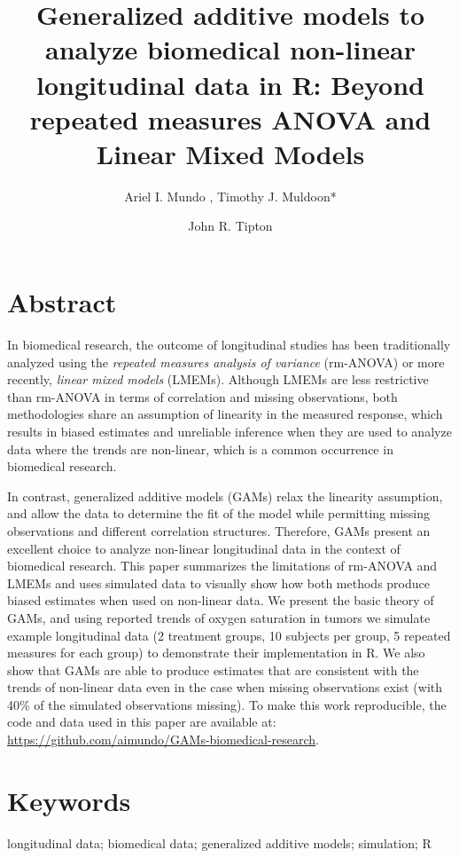 \documentclass[
]{article}
\title{\textbf{Generalized additive models to analyze biomedical non-linear longitudinal data in R: Beyond repeated measures ANOVA and Linear Mixed Models}}
\date{\vspace{-2.5em}}
\author{Ariel I. Mundo \orcidaffila{}, Timothy J. Muldoon*}
\affil{Department of Biomedical Engineering, University of Arkansas, Fayetteville, AR, USA}
\affil{\normalfont {tmuldoon@uark.edu}}
\author{John R. Tipton \orcidaffilb{}}
\affil{Department of Mathematical Sciences, University of Arkansas, Fayetteville, AR, USA}
\begin{document}
\maketitle

\hypertarget{abstract}{%
\section{Abstract}\label{abstract}}

In biomedical research, the outcome of longitudinal studies has been traditionally analyzed using the \emph{repeated measures analysis of variance} (rm-ANOVA) or more recently, \emph{linear mixed models} (LMEMs). Although LMEMs are less restrictive than rm-ANOVA in terms of correlation and missing observations, both methodologies share an assumption of linearity in the measured response, which results in biased estimates and unreliable inference when they are used to analyze data where the trends are non-linear, which is a common occurrence in biomedical research.

In contrast, generalized additive models (GAMs) relax the linearity assumption, and allow the data to determine the fit of the model while permitting missing observations and different correlation structures. Therefore, GAMs present an excellent choice to analyze non-linear longitudinal data in the context of biomedical research. This paper summarizes the limitations of rm-ANOVA and LMEMs and uses simulated data to visually show how both methods produce biased estimates when used on non-linear data. We present the basic theory of GAMs, and using reported trends of oxygen saturation in tumors we simulate example longitudinal data (2 treatment groups, 10 subjects per group, 5 repeated measures for each group) to demonstrate their implementation in R. We also show that GAMs are able to produce estimates that are consistent with the trends of non-linear data even in the case when missing observations exist (with 40\% of the simulated observations missing). To make this work reproducible, the code and data used in this paper are available at: \url{https://github.com/aimundo/GAMs-biomedical-research}.

\hypertarget{keywords}{%
\section*{Keywords}\label{keywords}}

longitudinal data; biomedical data; generalized additive models; simulation; R
\end{document}

